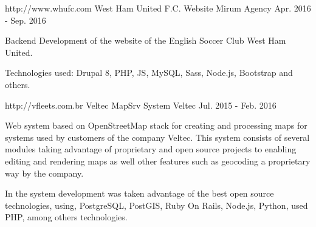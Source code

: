\begin{cventries}

 \cventry
    {http://www.whufc.com} %
    {West Ham United F.C. Website} %
    {Mirum Agency} %
    {Apr. 2016 - Sep. 2016} %
    {
      \begin{cvitems} %
        \item {Backend Development of the website of the English Soccer Club West Ham United.}
         \item { Technologies used: Drupal 8, PHP, JS, MySQL, Sass, Node.js, Bootstrap and others.}
      \end{cvitems}
    }


 \cventry
    {http://vfleets.com.br} %
    {Veltec MapSrv System} %
    {Veltec} %
    {Jul. 2015 - Feb. 2016} %
    {
      \begin{cvitems} %
        \item {Web system based on OpenStreetMap stack for creating and processing maps for systems used by customers of the company Veltec. This system consists of several modules taking advantage of proprietary and open source projects to enabling editing and rendering maps as well other features such as geocoding a proprietary way by the company.}
         \item {In the system development was taken advantage of the best open source technologies, using, PostgreSQL, PostGIS, Ruby On Rails, Node.js, Python, used PHP, among others technologies.}
      \end{cvitems}
    }

\end{cventries}

